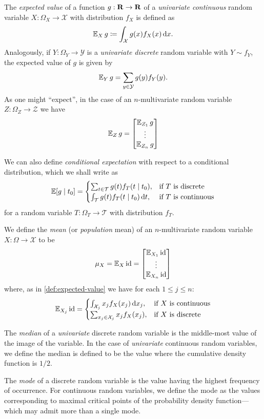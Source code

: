 \begin{definition}
\label{def:expected-value}
The \emph{expected value} of a function \(g: \mathbf{R} \to \mathbf{R}\) of a \emph{univariate
  continuous} random variable \(X: \Omega_X \to \mathcal{X}\) with distribution
\(f_X\) is defined as
\[
\operatorname{\mathbb{E}}_X g \coloneq \int_{\mathcal{X}} g(x) f_X(x)\, \mathrm{d} x.
\]
Analogously, if \(Y: \Omega_Y \to \mathcal{Y}\) is a \emph{univariate discrete}
random variable with \(Y \sim f_Y\), the expected value of \(g\) is given by
\[
\operatorname{\mathbb{E}}_Y g = \sum_{y \in \mathcal{Y}} g(y) f_Y(y).
\]
As one might ``expect'', in the case of an \(n\)-multivariate random variable
\(Z: \Omega_Z \to \mathcal{Z}\) we have
\[
\operatorname{\mathbb{E}}_Z g =
\begin{bmatrix}
  \operatorname{\mathbb{E}}_{Z_1} g \\
  \vdots \\
  \operatorname{\mathbb{E}}_{Z_n} g
\end{bmatrix}
\]

We can also define \emph{conditional expectation} with respect to a conditional
distribution, which we shall write as
\[
\operatorname{\mathbb{E}}[g \mid t_0] =
\begin{cases}
  \sum_{t \in \mathcal{T}} g(t) f_T(t \mid t_0), &\text{if } T \text{ is discrete}\\
  \int_{\mathcal{T}} g(t) f_T(t \mid t_0)\, \mathrm{d} t, &\text{if } T \text{ is continuous}
\end{cases}
\]
for a random variable \(T: \Omega_T \to \mathcal{T}\) with distribution \(f_T\).
\end{definition}

\begin{definition}
\label{def:mean-of-random-variable}
We define the \emph{mean} (or \emph{population} mean) of an \(n\)-multivariate
random variable \(X: \Omega \to \mathcal{X}\) to be
\[
\mu_X = \operatorname{\mathbb{E}}_X \operatorname{id} =
\begin{bmatrix}
  \operatorname{\mathbb{E}}_{X_1} \operatorname{id} \\
  \vdots \\
  \operatorname{\mathbb{E}}_{X_n} \operatorname{id}
\end{bmatrix}
\]
where, as in \cref{def:expected-value} we have for each \(1 \leq j \leq n\):
\[
\operatorname{\mathbb{E}}_{X_j} \operatorname{id} =
\begin{cases}
  \int_{\mathcal{X}_j} x_j f_X(x_j)\, \mathrm{d} x_j, &\text{if } X \text{ is
                                                   continuous} \\
  \sum_{x_j \in \mathcal{X}_j} x_j f_X(x_j), &\text{if } X \text{ is discrete}
\end{cases}
\]

The \emph{median} of a \emph{univariate} discrete random variable is the middle-most
value of the image of the variable. In the case of \emph{univariate} continuous random
variables, we define the median is defined to be the value where the cumulative
density function is \(1/2\).

The \emph{mode} of a discrete random variable is the value having the highest
frequency of occurrence. For continuous random variables, we define the mode as
the values corresponding to maximal critical points of the probability density
function---which may admit more than a single mode.
\end{definition}

